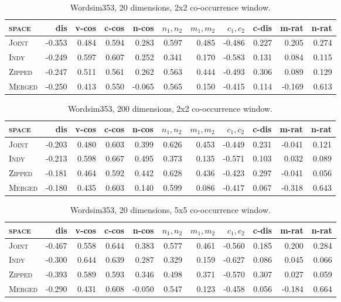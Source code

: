 \begin{table}
\begin{tabular}{lrrrrrrrrrr}
\hline
\textsc{space} & dis & v-cos & c-cos & n-cos & $n_1,n_2$ & $m_1,m_2$ & $c_1,c_2$ & c-dis & m-rat & n-rat \\
\hline
\textsc{Joint} & -0.353 & 0.484 & 0.594 & 0.283 & 0.597 & 0.485 & -0.486 & 0.227 & 0.205 & 0.274 \\
\textsc{Indy} & -0.249 & 0.597 & 0.607 & 0.252 & 0.341 & 0.170 & -0.583 & 0.131 & 0.084 & 0.115 \\
\textsc{Zipped} & -0.247 & 0.511 & 0.561 & 0.262 & 0.563 & 0.444 & -0.493 & 0.306 & 0.089 & 0.129 \\
\textsc{Merged} & -0.250 & 0.413 & 0.550 & -0.065 & 0.565 & 0.150 & -0.415 & 0.114 & -0.169 & 0.613 \\
\hline
\end{tabular}
\caption{Wordsim353, 20 dimensions, 2x2 co-occurrence window.}
\end{table}

\begin{table}
\begin{tabular}{lrrrrrrrrrr}
\hline
\textsc{space} & dis & v-cos & c-cos & n-cos & $n_1,n_2$ & $m_1,m_2$ & $c_1,c_2$ & c-dis & m-rat & n-rat \\
\hline
\textsc{Joint} & -0.203 & 0.480 & 0.603 & 0.399 & 0.626 & 0.453 & -0.449 & 0.231 & -0.041 & 0.121 \\
\textsc{Indy} & -0.213 & 0.598 & 0.667 & 0.495 & 0.373 & 0.135 & -0.571 & 0.103 & 0.032 & 0.089 \\
\textsc{Zipped} & -0.181 & 0.464 & 0.592 & 0.442 & 0.628 & 0.436 & -0.423 & 0.297 & -0.041 & 0.056 \\
\textsc{Merged} & -0.180 & 0.435 & 0.603 & 0.140 & 0.599 & 0.086 & -0.417 & 0.067 & -0.318 & 0.643 \\
\hline
\end{tabular}
\caption{Wordsim353, 200 dimensions, 2x2 co-occurrence window.}
\end{table}

\begin{table}
\begin{tabular}{lrrrrrrrrrr}
\hline
\textsc{space} & dis & v-cos & c-cos & n-cos & $n_1,n_2$ & $m_1,m_2$ & $c_1,c_2$ & c-dis & m-rat & n-rat \\
\hline
\textsc{Joint} & -0.467 & 0.558 & 0.644 & 0.383 & 0.577 & 0.461 & -0.560 & 0.185 & 0.200 & 0.284 \\
\textsc{Indy} & -0.300 & 0.644 & 0.639 & 0.287 & 0.329 & 0.159 & -0.627 & 0.086 & 0.045 & 0.066 \\
\textsc{Zipped} & -0.393 & 0.589 & 0.593 & 0.346 & 0.498 & 0.371 & -0.570 & 0.307 & 0.027 & 0.059 \\
\textsc{Merged} & -0.290 & 0.431 & 0.608 & -0.050 & 0.547 & 0.123 & -0.458 & 0.056 & -0.184 & 0.664 \\
\hline
\end{tabular}
\caption{Wordsim353, 20 dimensions, 5x5 co-occurrence window.}
\end{table}

